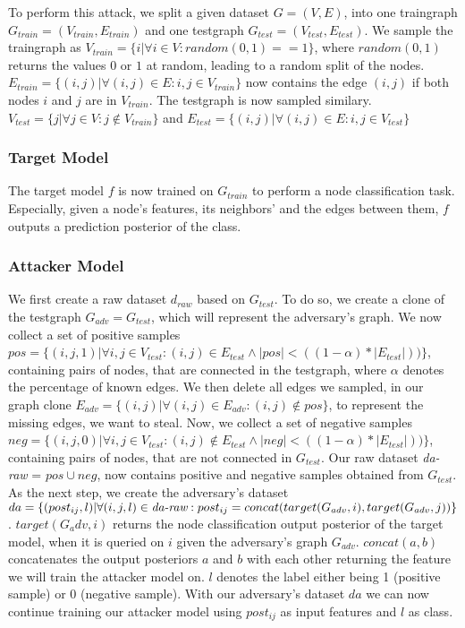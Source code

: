       To perform this attack, we split a given dataset $G = (V, E)$, into one traingraph $G_{train} = (V_{train}, E_{train})$ and one testgraph $G_{test} = (V_{test}, E_{test})$.  
      We sample the traingraph as $V_{train} = \{i | \forall i \in V: random(0, 1) == 1\}$, where $random(0, 1)$ returns the values $0$ or $1$ at random, leading to a random split of the nodes.
      $E_{train} = \{(i, j) | \forall (i,j) \in E: i, j \in V_{train}\}$ now contains the edge $(i,j)$ if both nodes $i$ and $j$ are in $V_{train}$.
      The testgraph is now sampled similary.
      $V_{test} = \{j | \forall j \in V: j \not\in V_{train}\}$ and $E_{test} = \{(i, j) | \forall (i,j) \in E: i, j \in V_{test}\}$

      \subsubsection{Target Model}

        The target model $f$ is now trained on $G_{train}$ to perform a node classification task.
        Especially, given a node's features, its neighbors' and the edges between them, $f$ outputs a prediction posterior of the class.

      \subsubsection{Attacker Model}

        We first create a raw dataset $d_{raw}$ based on $G_{test}$.
        To do so, we create a clone of the testgraph $G_{adv} = G_{test}$, which will represent the adversary's graph.
        We now collect a set of positive samples $pos = \{(i,j, 1) | \forall i,j \in V_{test}: (i,j) \in E_{test} \wedge |pos| < ((1 - \alpha) * |E_{test}|))\}$, containing pairs of nodes, that are connected in the testgraph, where $\alpha$ denotes the percentage of known edges.
        We then delete all edges we sampled, in our graph clone $E_{adv} = \{(i,j) | \forall (i,j) \in E_{adv}: (i,j) \not\in pos\}$, to represent the missing edges, we want to steal.
        Now, we collect a set of negative samples $neg = \{(i,j, 0) | \forall i,j \in V_{test}: (i,j) \not\in E_{test} \wedge |neg| < ((1 - \alpha) * |E_{test}|))\}$, containing pairs of nodes, that are not connected in $G_{test}$.
        Our raw dataset \emph{da-raw} = $pos \cup neg$, now contains positive and negative samples obtained from $G_{test}$.
        As the next step, we create the adversary's dataset $da = \{(post_{ij}, l) | \forall (i,j,l)\in\emph{da-raw}: post_{ij} = concat(target(G_{adv}, i), target(G_{adv}, j))\}$.
        $target(G_adv, i)$ returns the node classification output posterior of the target model, when it is queried on $i$ given the adversary's graph $G_{adv}$.
        $concat(a, b)$ concatenates the output posteriors $a$ and $b$ with each other returning the feature we will train the attacker model on.
        $l$ denotes the label either being 1 (positive sample) or 0 (negative sample).
        With our adversary's dataset $da$ we can now continue training our attacker model using $post_{ij}$ as input features and $l$ as class.

